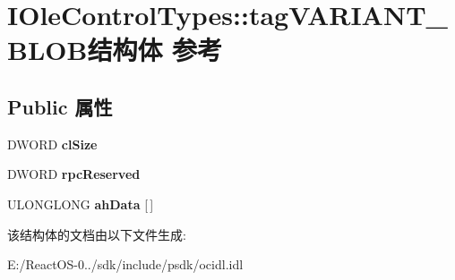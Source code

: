 \hypertarget{struct_i_ole_control_types_1_1tag_v_a_r_i_a_n_t___b_l_o_b}{}\section{I\+Ole\+Control\+Types\+:\+:tag\+V\+A\+R\+I\+A\+N\+T\+\_\+\+B\+L\+O\+B结构体 参考}
\label{struct_i_ole_control_types_1_1tag_v_a_r_i_a_n_t___b_l_o_b}
\subsection*{Public 属性}
\begin{DoxyCompactItemize}
\item 
\mbox{\label{struct_i_ole_control_types_1_1tag_v_a_r_i_a_n_t___b_l_o_b_a6e5cc6c9c5432be82c6cd4aa6e9857b4}} 
D\+W\+O\+RD {\bfseries cl\+Size}
\item 
\mbox{\label{struct_i_ole_control_types_1_1tag_v_a_r_i_a_n_t___b_l_o_b_ab9766ebd138a1c9a038343492660f005}} 
D\+W\+O\+RD {\bfseries rpc\+Reserved}
\item 
\mbox{\label{struct_i_ole_control_types_1_1tag_v_a_r_i_a_n_t___b_l_o_b_a77b90667c02d7e9b801c663952a1eb3b}} 
U\+L\+O\+N\+G\+L\+O\+NG {\bfseries ah\+Data} \mbox{[}$\,$\mbox{]}
\end{DoxyCompactItemize}


该结构体的文档由以下文件生成\+:\begin{DoxyCompactItemize}
\item 
E\+:/\+React\+O\+S-\/0../sdk/include/psdk/ocidl.\+idl\end{DoxyCompactItemize}
